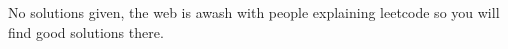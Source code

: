 \documentclass[twoside=false,DIV=14]{scrartcl}
\begin{document}
No solutions given, the web is awash with people explaining leetcode so you will find good solutions there.




\end{document}
